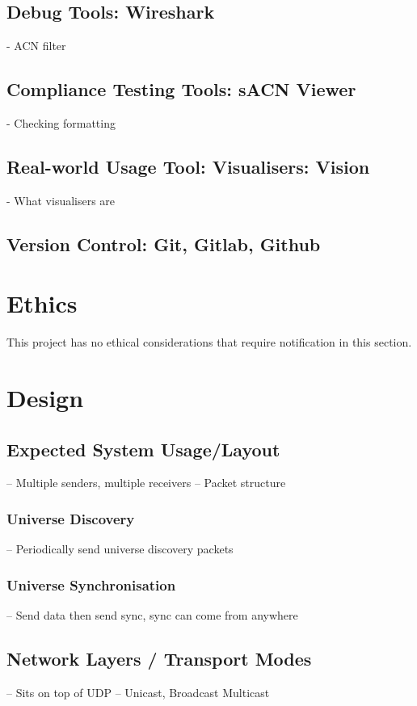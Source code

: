 \documentclass[11pt,a4paper]{report}
\begin{document}
\subsection{Debug Tools: Wireshark}
	- ACN filter
\subsection{Compliance Testing Tools: sACN Viewer}
- Checking formatting
\subsection{Real-world Usage Tool: Visualisers: Vision}
	- What visualisers are
\subsection{Version Control: Git, Gitlab, Github}

\section{Ethics}
This project has no ethical considerations that require notification in this section.
	
\section{Design}
\subsection{Expected System Usage/Layout}
-- Multiple senders, multiple receivers
-- Packet structure


\subsubsection{Universe Discovery}
-- Periodically send universe discovery packets

\subsubsection{Universe Synchronisation}
-- Send data then send sync, sync can come from anywhere

\subsection{Network Layers / Transport Modes}
-- Sits on top of UDP
-- Unicast, Broadcast Multicast
\end{document}
